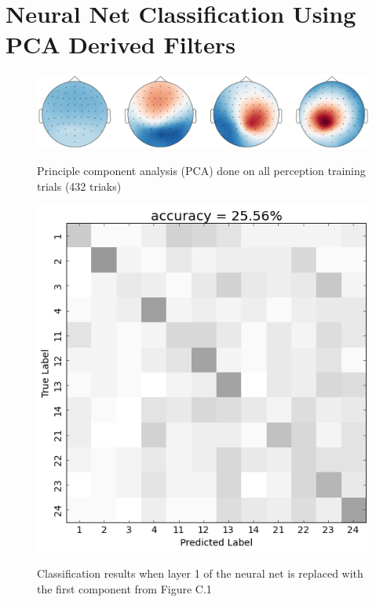 \chapter{Neural Net Classification Using PCA Derived Filters} \label{appendix:PCAInvestigation}
\begin{figure}[htbp] 
  \begin{center}
   \includegraphics[width=.5\textwidth,keepaspectratio=true]{Figures/PCA_SVM}
   \\\vspace{-0.8em}
    \caption{Principle component analysis (PCA) done on all perception training trials (432 triaks)}
    \label{fig:PCA_SVM}
  \end{center}
\end{figure}
\begin{figure}[htbp] 
  \begin{center}
    \includegraphics[scale=0.5]{Figures/PC0_confusion}
   \\\vspace{-0.8em}
    \caption{Classification results when layer 1 of the neural net is replaced with the first component from Figure C.1}
    \label{fig:PC0_confusion}
  \end{center}
\end{figure}
